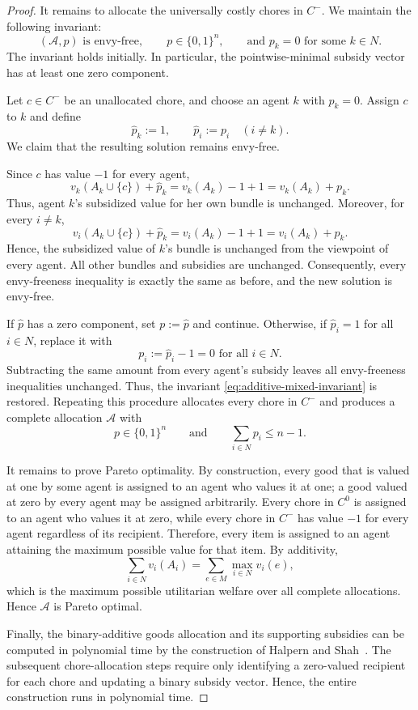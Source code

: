 \documentclass[sigconf,anonymous,nonacm]{aamas}
\newcommand{\alloc}{\mathcal{A}}
\begin{document}
\begin{proof}
It remains to allocate the universally costly chores in $C^-$. We maintain the following invariant:
\begin{equation}\label{eq:additive-mixed-invariant}
(\alloc,p)\text{ is envy-free},\qquad
p\in\{0,1\}^n,
\qquad
\text{and }p_k=0\text{ for some }k\in N.
\end{equation}
The invariant holds initially. In particular, the pointwise-minimal subsidy vector has at least one zero component.

Let $c\in C^-$ be an unallocated chore, and choose an agent $k$ with
$p_k=0$. Assign $c$ to $k$ and define
\[
\widehat p_k:=1,
\qquad
\widehat p_i:=p_i\quad(i\neq k).
\]
We claim that the resulting solution remains envy-free.

Since $c$ has value $-1$ for every agent,
\[
v_k(A_k\cup\{c\})+\widehat p_k
=
v_k(A_k)-1+1
=
v_k(A_k)+p_k.
\]
Thus, agent $k$'s subsidized value for her own bundle is unchanged. Moreover, for every $i\neq k$,
\[
v_i(A_k\cup\{c\})+\widehat p_k
=
v_i(A_k)-1+1
=
v_i(A_k)+p_k.
\]
Hence, the subsidized value of $k$'s bundle is unchanged from the viewpoint of every agent. All other bundles and subsidies are unchanged. Consequently, every envy-freeness inequality is exactly the same as before, and the new solution is envy-free.

If $\widehat p$ has a zero component, set $p:=\widehat p$ and continue. Otherwise, if $\widehat p_i=1$ for all $i\in N$, replace it with
\[
p_i:=\widehat p_i-1=0 \text{ for all } i\in N.
\]
Subtracting the same amount from every agent's subsidy leaves all envy-freeness inequalities unchanged. Thus, the invariant \eqref{eq:additive-mixed-invariant} is restored. Repeating this procedure allocates every chore in $C^-$ and produces a complete allocation $\alloc$ with
\[
p\in\{0,1\}^n
\qquad\text{and}\qquad
\sum_{i\in N}p_i\leq n-1.
\]

It remains to prove Pareto optimality. By construction, every good that is valued at one by some agent is assigned to an agent who values it at one; a good valued at zero by every agent may be assigned arbitrarily. Every chore in $C^0$ is assigned to an agent who values it at zero, while every chore in $C^-$ has value $-1$ for every agent regardless of its recipient. Therefore, every item is assigned to an agent attaining the maximum possible value for that item. By additivity,
\[
\sum_{i\in N}v_i(A_i)
=
\sum_{e\in M}\max_{i\in N}v_i(e),
\]
which is the maximum possible utilitarian welfare over all complete allocations. Hence $\alloc$ is Pareto optimal.

Finally, the binary-additive goods allocation and its supporting subsidies can be computed in polynomial time by the construction of Halpern and Shah~\cite{HS19}. The subsequent chore-allocation steps require only identifying a zero-valued recipient for each chore and updating a binary subsidy vector. Hence, the entire construction runs in polynomial time.
\end{proof}



\end{document}

